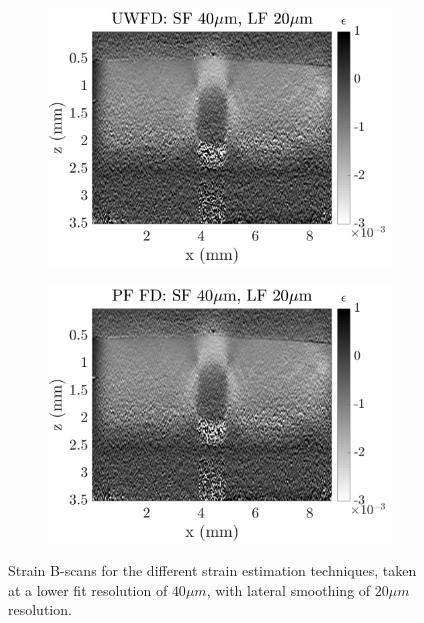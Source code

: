\begin{figure}[h]
\begin{subfigure}{0.49\textwidth}
        \includegraphics[width=\textwidth]{appendix_figs/uwfd_fr40_lr20.png}
    \end{subfigure}
    \begin{subfigure}{0.49\textwidth}
    	\centering
        \includegraphics[width=\textwidth]{appendix_figs/pffd_fr40_lr20.png}
    \end{subfigure}    
    \caption{Strain B-scans for the different strain estimation techniques, taken at a lower fit resolution of $40\mu m$, with lateral smoothing of $20 \mu m$ resolution.}
	\label{fr40_lr20}
\end{figure}


